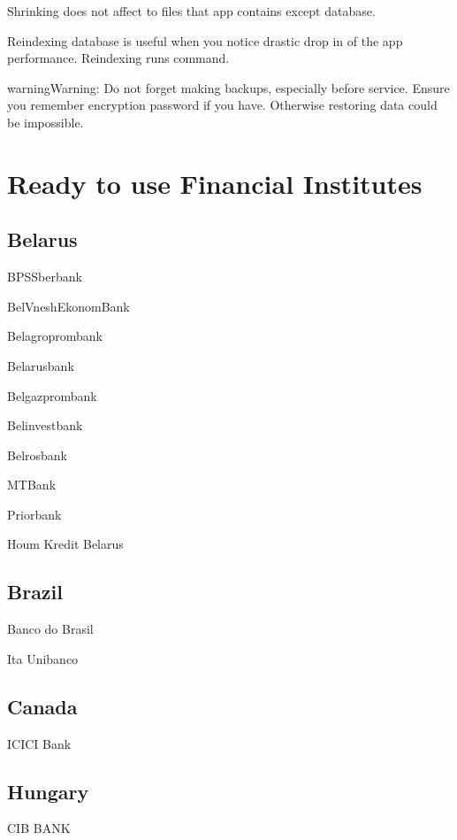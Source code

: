 \documentclass[a4paper,10pt,english]{sphinxmanual}
\begin{document}
Shrinking does not affect to files that app contains except database.

Reindexing database is useful when you notice drastic drop in of the app performance.
Reindexing runs  command.

\begin{sphinxadmonition}{warning}{Warning:}
Do not forget making backups, especially before service. Ensure you remember encryption password if you have. Otherwise restoring data could be impossible.
\end{sphinxadmonition}


\chapter{Ready to use Financial Institutes}
\label{\detokenize{banks:ready-to-use-financial-institutes}}\label{\detokenize{banks:chapter-supported-banks}}\label{\detokenize{banks::doc}}

\section{Belarus}
\label{\detokenize{banks:belarus}}
BPSSberbank

BelVneshEkonomBank

Belagroprombank

Belarusbank

Belgazprombank

Belinvestbank

Belrosbank

MTBank

Priorbank

Houm Kredit Belarus


\section{Brazil}
\label{\detokenize{banks:brazil}}
Banco do Brasil

Ita Unibanco


\section{Canada}
\label{\detokenize{banks:canada}}
ICICI Bank


\section{Hungary}
\label{\detokenize{banks:hungary}}
CIB BANK
\end{document}
